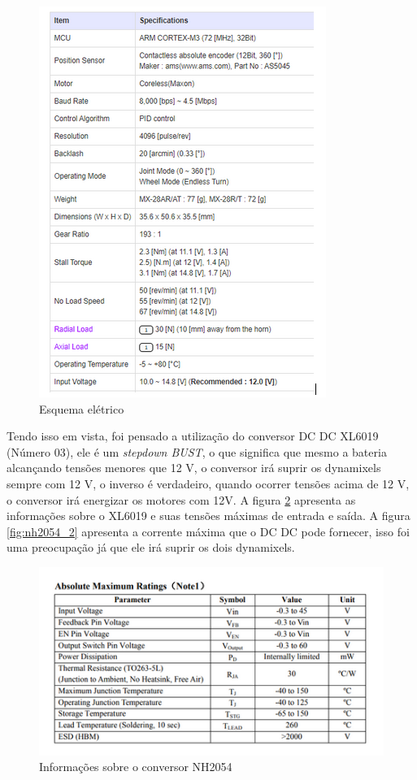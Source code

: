 \begin{figure}[H]
	\centering
	\includegraphics[scale=0.7, angle=0]{Figures/dynamixel_config.png}
	\caption{Esquema elétrico}
	\label{fig:dyna_config}
\end{figure}

Tendo isso em vista, foi pensado a utilização do conversor DC DC XL6019 (Número 03), ele é um \textit{stepdown BUST}, o que significa que mesmo a bateria alcançando tensões menores que 12 V, o conversor irá suprir os dynamixels sempre com 12 V, o inverso é verdadeiro, quando ocorrer tensões acima de 12 V, o conversor irá energizar os motores com 12V. A figura \ref{fig:nh2054_1} apresenta as informações sobre o XL6019 e suas tensões máximas de entrada e saída. A figura \ref{fig:nh2054_2} apresenta a corrente máxima que o DC DC pode fornecer, isso foi uma preocupação já que ele irá suprir os dois dynamixels.

\begin{figure}[H]
	\centering
	\includegraphics[scale=0.7, angle=0]{Figures/NH2054_1.png}
	\caption{Informações sobre o conversor NH2054}
	\label{fig:nh2054_1}
\end{figure}

